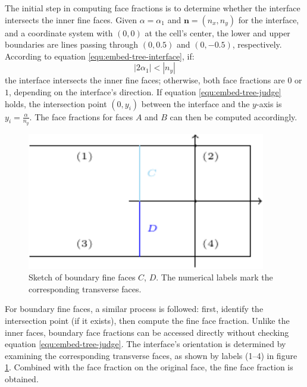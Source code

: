 The initial step in computing face fractions is to determine whether the interface intersects the inner fine faces. Given $\alpha = \alpha_1$ and $\mathbf{n} = (n_x, n_y)$ for the interface, and a coordinate system with $(0,0)$ at the cell’s center, the lower and upper boundaries are lines passing through $(0,0.5)$ and $(0,-0.5)$, respectively. According to equation \ref{equ:embed-tree-interface}, if:
\begin{equation}\label{equ:embed-tree-judge}
    |2\alpha_1| < |n_y|
\end{equation}
the interface intersects the inner fine faces; otherwise, both face fractions are $0$ or $1$, depending on the interface’s direction. If equation \ref{equ:embed-tree-judge} holds, the intersection point $(0, y_i)$ between the interface and the $y$-axis is $y_i = \frac{\alpha}{n_y}$. The face fractions for faces $A$ and $B$ can then be computed accordingly.

\begin{figure}[ht]
    \centering
    \includegraphics[height=6cm]{./image/embed-tree-h/fs_2D2.pdf}
    \caption{Sketch of boundary fine faces $C$, $D$. The numerical labels mark the corresponding transverse faces.}
    \label{fig:embed-tree-2Dboundary}
\end{figure}

For boundary fine faces, a similar process is followed: first, identify the intersection point (if it exists), then compute the fine face fraction. Unlike the inner faces, boundary face fractions can be accessed directly without checking equation \ref{equ:embed-tree-judge}. The interface’s orientation is determined by examining the corresponding transverse faces, as shown by labels (1–4) in figure \ref{fig:embed-tree-2Dboundary}. Combined with the face fraction on the original face, the fine face fraction is obtained.

